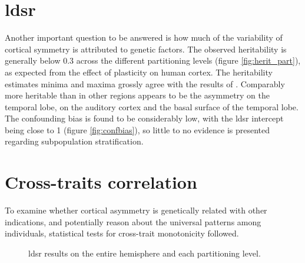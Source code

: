 \section{\acs{ldsr}}
\label{sec:ldsr_results}
Another important question to be answered is how much of the variability of cortical symmetry is attributed to genetic factors. The observed heritability is generally below 0.3 across the different partitioning levels (figure \autoref{fig:herit_part}), as expected from the effect of plasticity on human cortex. The heritability estimates minima and maxima grossly agree with the results of \citet{Sha2021}. Comparably more heritable than in other regions appears to be the asymmetry on the temporal lobe, on the auditory cortex and the basal surface of the temporal lobe.  The confounding bias is found to be considerably low, with the \ac{ldsr} intercept being close to 1 \cite{Bulik-Sullivan2015} (figure \autoref{fig:confbias}), so little to no evidence is presented regarding subpopulation stratification. 


\section{Cross-traits correlation}
\label{sec:ct-res}
To examine whether cortical asymmetry is genetically related with other indications, and potentially reason about the universal patterns among individuals, statistical tests for cross-trait monotonicity followed. 

\begin{figure}[H]
	\centering
	\quad
	\caption[LDSR results across partitioning levels]{\Ac{ldsr} results on the entire hemisphere and each partitioning level.}
	\label{fig:ldsr}
\end{figure}


